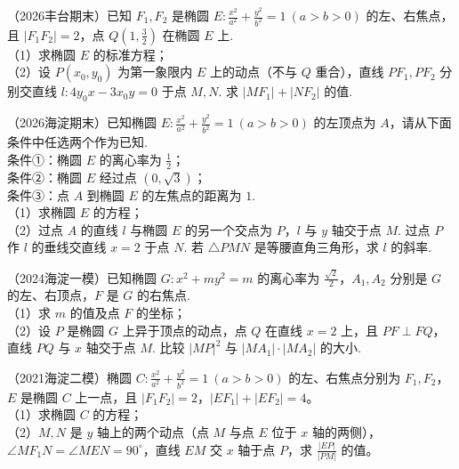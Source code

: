 \begin{example} %
（2026丰台期末）已知 $F_1,F_2$ 是椭圆 $E:\frac{x^2}{a^2}+\frac{y^2}{b^2}=1\ (a>b>0)$ 的左、右焦点，且 $\lvert F_1F_2\rvert=2$，点 $Q\left(1,\frac{3}{2}\right)$ 在椭圆 $E$ 上.\\
（1）求椭圆 $E$ 的标准方程；\\
（2）设 $P(x_0,y_0)$ 为第一象限内 $E$ 上的动点（不与 $Q$ 重合），直线 $PF_1,PF_2$ 分别交直线 $l:4y_0x-3x_0y=0$ 于点 $M,N$. 求 $\lvert MF_1\rvert+\lvert NF_2\rvert$ 的值.
\end{example}
\begin{example} %
（2026海淀期末）已知椭圆 $E:\frac{x^2}{a^2}+\frac{y^2}{b^2}=1\ (a>b>0)$ 的左顶点为 $A$，请从下面条件中任选两个作为已知.\\
条件①：椭圆 $E$ 的离心率为 $\frac{1}{2}$；\\
条件②：椭圆 $E$ 经过点 $(0,\sqrt{3})$；\\
条件③：点 $A$ 到椭圆 $E$ 的左焦点的距离为 $1$.\\
（1）求椭圆 $E$ 的方程；\\
（2）过点 $A$ 的直线 $l$ 与椭圆 $E$ 的另一个交点为 $P$，$l$ 与 $y$ 轴交于点 $M$. 过点 $P$ 作 $l$ 的垂线交直线 $x=2$ 于点 $N$. 若 $\triangle PMN$ 是等腰直角三角形，求 $l$ 的斜率.
\end{example}

\begin{example} %
（2024海淀一模）已知椭圆 $G:x^2+my^2=m$ 的离心率为 $\frac{\sqrt{2}}{2}$，$A_1,A_2$ 分别是 $G$ 的左、右顶点，$F$ 是 $G$ 的右焦点.\\
（1）求 $m$ 的值及点 $F$ 的坐标；\\
（2）设 $P$ 是椭圆 $G$ 上异于顶点的动点，点 $Q$ 在直线 $x=2$ 上，且 $PF\perp FQ$，直线 $PQ$ 与 $x$ 轴交于点 $M$. 比较 $\lvert MP\rvert^2$ 与 $\lvert MA_1\rvert\cdot\lvert MA_2\rvert$ 的大小.
\end{example}

\begin{example} %
（2021海淀二模）椭圆 $C:\frac{x^2}{a^2}+\frac{y^2}{b^2}=1\ (a>b>0)$ 的左、右焦点分别为 $F_1,F_2$，$E$ 是椭圆 $C$ 上一点，且 $\lvert F_1F_2\rvert=2$，$\lvert EF_1\rvert+\lvert EF_2\rvert=4$。\\
（1）求椭圆 $C$ 的方程；\\
（2）$M,N$ 是 $y$ 轴上的两个动点（点 $M$ 与点 $E$ 位于 $x$ 轴的两侧），$\angle MF_1N=\angle MEN=90^\circ$，直线 $EM$ 交 $x$ 轴于点 $P$，求 $\frac{\lvert EP\rvert}{\lvert PM\rvert}$ 的值。
\end{example}






